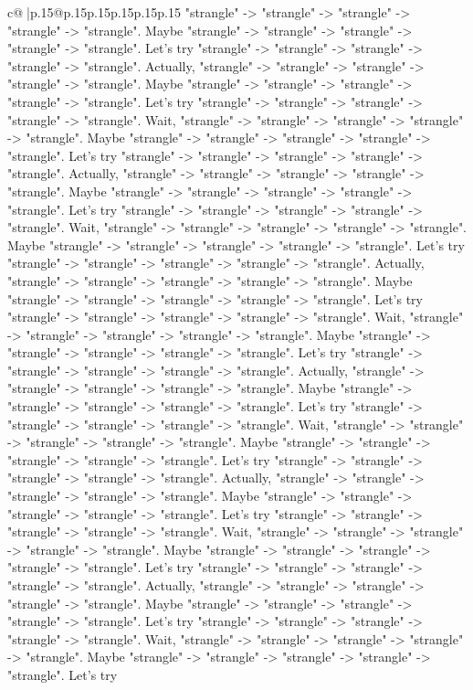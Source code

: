 \documentclass{article}
\begin{document}
{\begin{supertabular}{c@{$\;$}|p{.15\linewidth}@{}p{.15\linewidth}p{.15\linewidth}p{.15\linewidth}p{.15\linewidth}p{.15\linewidth}}
{{{"strangle" {-}> "strangle" {-}> "strangle" {-}> "strangle" {-}> "strangle". Maybe "strangle" {-}> "strangle" {-}> "strangle" {-}> "strangle" {-}> "strangle". Let's try "strangle" {-}> "strangle" {-}> "strangle" {-}> "strangle" {-}> "strangle". Actually, "strangle" {-}> "strangle" {-}> "strangle" {-}> "strangle" {-}> "strangle". Maybe "strangle" {-}> "strangle" {-}> "strangle" {-}> "strangle" {-}> "strangle". Let's try "strangle" {-}> "strangle" {-}> "strangle" {-}> "strangle" {-}> "strangle". Wait, "strangle" {-}> "strangle" {-}> "strangle" {-}> "strangle" {-}> "strangle". Maybe "strangle" {-}> "strangle" {-}> "strangle" {-}> "strangle" {-}> "strangle". Let's try "strangle" {-}> "strangle" {-}> "strangle" {-}> "strangle" {-}> "strangle". Actually, "strangle" {-}> "strangle" {-}> "strangle" {-}> "strangle" {-}> "strangle". Maybe "strangle" {-}> "strangle" {-}> "strangle" {-}> "strangle" {-}> "strangle". Let's try "strangle" {-}> "strangle" {-}> "strangle" {-}> "strangle" {-}> "strangle". Wait, "strangle" {-}> "strangle" {-}> "strangle" {-}> "strangle" {-}> "strangle". Maybe "strangle" {-}> "strangle" {-}> "strangle" {-}> "strangle" {-}> "strangle". Let's try "strangle" {-}> "strangle" {-}> "strangle" {-}> "strangle" {-}> "strangle". Actually, "strangle" {-}> "strangle" {-}> "strangle" {-}> "strangle" {-}> "strangle". Maybe "strangle" {-}> "strangle" {-}> "strangle" {-}> "strangle" {-}> "strangle". Let's try "strangle" {-}> "strangle" {-}> "strangle" {-}> "strangle" {-}> "strangle". Wait, "strangle" {-}> "strangle" {-}> "strangle" {-}> "strangle" {-}> "strangle". Maybe "strangle" {-}> "strangle" {-}> "strangle" {-}> "strangle" {-}> "strangle". Let's try "strangle" {-}> "strangle" {-}> "strangle" {-}> "strangle" {-}> "strangle". Actually, "strangle" {-}> "strangle" {-}> "strangle" {-}> "strangle" {-}> "strangle". Maybe "strangle" {-}> "strangle" {-}> "strangle" {-}> "strangle" {-}> "strangle". Let's try "strangle" {-}> "strangle" {-}> "strangle" {-}> "strangle" {-}> "strangle". Wait, "strangle" {-}> "strangle" {-}> "strangle" {-}> "strangle" {-}> "strangle". Maybe "strangle" {-}> "strangle" {-}> "strangle" {-}> "strangle" {-}> "strangle". Let's try "strangle" {-}> "strangle" {-}> "strangle" {-}> "strangle" {-}> "strangle". Actually, "strangle" {-}> "strangle" {-}> "strangle" {-}> "strangle" {-}> "strangle". Maybe "strangle" {-}> "strangle" {-}> "strangle" {-}> "strangle" {-}> "strangle". Let's try "strangle" {-}> "strangle" {-}> "strangle" {-}> "strangle" {-}> "strangle". Wait, "strangle" {-}> "strangle" {-}> "strangle" {-}> "strangle" {-}> "strangle". Maybe "strangle" {-}> "strangle" {-}> "strangle" {-}> "strangle" {-}> "strangle". Let's try "strangle" {-}> "strangle" {-}> "strangle" {-}> "strangle" {-}> "strangle". Actually, "strangle" {-}> "strangle" {-}> "strangle" {-}> "strangle" {-}> "strangle". Maybe "strangle" {-}> "strangle" {-}> "strangle" {-}> "strangle" {-}> "strangle". Let's try "strangle" {-}> "strangle" {-}> "strangle" {-}> "strangle" {-}> "strangle". Wait, "strangle" {-}> "strangle" {-}> "strangle" {-}> "strangle" {-}> "strangle". Maybe "strangle" {-}> "strangle" {-}> "strangle" {-}> "strangle" {-}> "strangle". Let's try }}}
\end{supertabular}}
\end{document}
